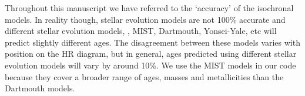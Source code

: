 Throughout this manuscript we have referred to the `accuracy' of the
isochronal models.
In reality though, stellar evolution models are not 100\% accurate and
different stellar evolution models, \eg, MIST, Dartmouth, Yonsei-Yale, etc
will predict slightly different ages.
The disagreement between these models varies with position on the HR diagram,
but in general, ages predicted using different stellar evolution models will
vary by around 10\%.
We use the MIST models in our code because they cover a broader range of ages,
masses and metallicities than the Dartmouth models.
